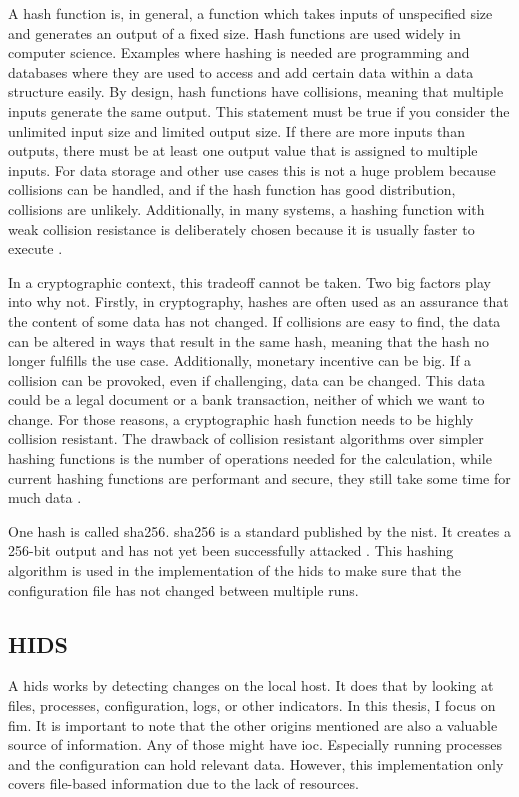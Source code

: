 A hash function is, in general, a function which takes inputs of unspecified size and generates an output of a fixed size. Hash functions are used widely in computer science. Examples where hashing is needed are programming and databases where they are used to access and add certain data within a data structure easily. By design, hash functions have \glspl{collision}, meaning that multiple inputs generate the same output. This statement must be true if you consider the unlimited input size and limited output size. If there are more inputs than outputs, there must be at least one output value that is assigned to multiple inputs. For data storage and other use cases this is not a huge problem because collisions can be handled, and if the hash function has good distribution, collisions are unlikely. Additionally, in many systems, a hashing function with weak collision resistance is deliberately chosen because it is usually faster to execute \cite{hash:noncrypto, hash:slow}.

In a cryptographic context, this tradeoff cannot be taken. Two big factors play into why not. Firstly, in cryptography, hashes are often used as an assurance that the content of some data has not changed. If collisions are easy to find, the data can be altered in ways that result in the same hash, meaning that the hash no longer fulfills the use case. Additionally, monetary incentive can be big. If a collision can be provoked, even if challenging, data can be changed. This data could be a legal document or a bank transaction, neither of which we want to change. For those reasons, a cryptographic hash function needs to be highly collision resistant. The drawback of collision resistant algorithms over simpler hashing functions is the number of operations needed for the calculation, while current hashing functions are performant and secure, they still take some time for much data \cite{crypto}.

One \gls{hash} is called \gls{sha256}. \gls{sha256} is a standard published by the \gls{nist}. It creates a 256-bit output and has not yet been successfully attacked \cite{sha, crypto}. This hashing algorithm is used in the implementation of the \gls{hids} to make sure that the configuration file has not changed between multiple runs.


\subsection{HIDS}
\label{sec:def:hids}

A \gls{hids} works by detecting changes on the local host. It does that by looking at files, processes, configuration, logs, or other indicators. In this thesis, I focus on \gls{fim}. It is important to note that the other origins mentioned are also a valuable source of information. Any of those might have \gls{ioc}. Especially running processes and the configuration can hold relevant data. However, this implementation only covers file-based information due to the lack of resources.


